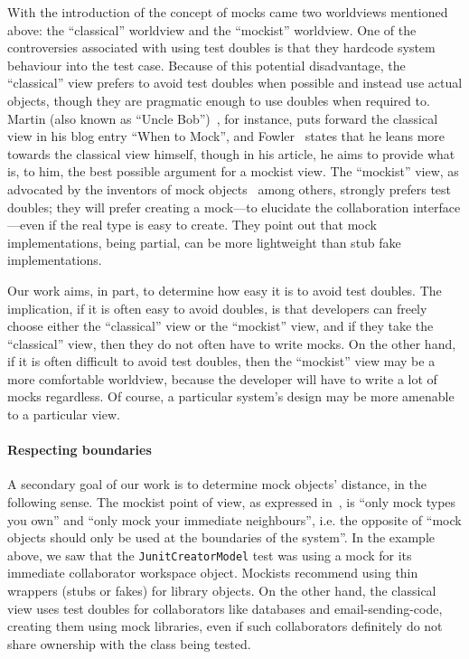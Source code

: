 With the introduction of the concept of mocks came two worldviews mentioned above: the ``classical'' worldview and the ``mockist'' worldview.
One of the controversies associated with using test doubles is that they hardcode system behaviour into the test case. Because of this potential disadvantage, the ``classical'' view prefers to avoid test doubles when possible and instead use actual objects, though they are pragmatic enough to use doubles when required to. Martin (also known as ``Uncle Bob'')~\cite{martin14:_when_mock}, for instance, puts forward the classical view in his blog entry ``When to Mock'', and Fowler~\cite{fowler07:_mocks_arent_stubs} states that he leans more towards the classical view himself, though in his article, he aims to provide what is, to him, the best possible argument for a mockist view. The ``mockist'' view, as advocated by the inventors of mock objects~\cite{freeman04:_mock_roles_objec} among others, strongly prefers test doubles; they will prefer creating a mock---to elucidate the collaboration interface---even if the real type is easy to create. They point out that mock implementations, being partial, can be more lightweight than stub fake implementations.


Our work aims, in part, to determine how easy it is to avoid test doubles. The implication, if it is often easy to avoid doubles, is that developers can freely choose either the ``classical'' view or the ``mockist'' view, and if they take the ``classical'' view, then they do not often have to write mocks. On the other hand, if it is often difficult to avoid test doubles, then the ``mockist'' view may be a more comfortable worldview, because the developer will have to write a lot of mocks regardless. Of course, a particular system's design may be more amenable to a particular view.



\paragraph{Respecting boundaries} A secondary goal of our work is to determine mock objects' distance, in the following sense.
The mockist point of view, as expressed
in~\cite{freeman04:_mock_roles_objec}, is ``only mock types you own'' and ``only mock your immediate
neighbours'', i.e. the opposite of ``mock objects should only be used
at the boundaries of the system''. In the example above, we saw that the
\texttt{JunitCreatorModel} test was using a mock for its immediate collaborator
workspace object. Mockists recommend using thin wrappers (stubs or fakes) for 
library objects. On the other hand, the classical view uses test doubles
for collaborators like databases and email-sending-code, creating them using mock libraries, even if such collaborators definitely
do not share ownership with the class being tested.

